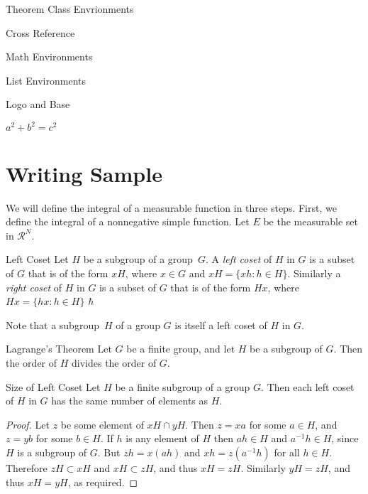 \documentclass[11pt]{elegantbook}
\begin{document}
\begin{introduction}
\item Theorem Class Envrionments
\item Cross Reference
\item Math Environments
\item List Environments
\item Logo and Base 
\item $a^2+b^2=c^2$
\end{introduction}


\lipsum[1]

\section{Writing Sample}

We will define the integral of a measurable function in three steps. First, we define the integral of a nonnegative simple function. Let $E$ be the measurable set in $\mathcal{R}^N$.

\begin{definition}{Left Coset}{}
Let $H$ be a subgroup of a group~$G$.  A \emph{left coset} of $H$ in $G$ is a subset of $G$ that is of the form $xH$, where $x \in G$ and $xH = \{ xh : h \in H \}$. Similarly a \emph{right coset} of $H$ in $G$ is a subset of $G$ that is of the form $Hx$, where $Hx = \{ hx : h \in H \}$ $\hbar$
\end{definition}

\begin{note}
Note that a subgroup~$H$ of a group $G$ is itself a left coset of $H$ in $G$.
\end{note}

\lipsum[2]

\begin{theorem}{Lagrange's Theorem}{}
Let $G$ be a finite group, and let $H$ be a subgroup of $G$.  Then the order of $H$ divides the order of $G$.
\end{theorem}

\lipsum[3]

   
\begin{proposition}{Size of Left Coset}{}
Let $H$ be a finite subgroup of a group $G$.  Then each left coset of $H$ in $G$ has the same number of elements as $H$.
\end{proposition}

\begin{proof}
Let $z$ be some element of $xH \cap yH$.  Then $z = xa$ for some $a \in H$, and $z = yb$ for some $b \in H$. If $h$ is any element of $H$ then $ah \in H$ and $a^{-1}h \in H$, since $H$ is a subgroup of $G$. But $zh = x(ah)$ and $xh = z(a^{-1}h)$ for all $h \in H$. Therefore $zH \subset xH$ and $xH \subset zH$, and thus $xH = zH$.  Similarly $yH = zH$, and thus $xH = yH$, as required.
\end{proof}
\end{document}
